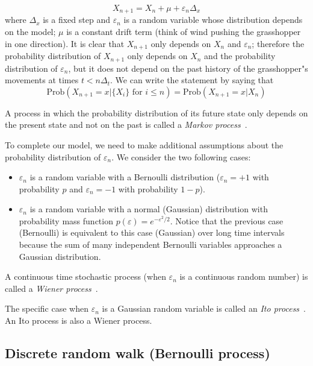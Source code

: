 \documentclass[justified, sixbynine]{tufte-book}
\theoremstyle{plain}%
\newtheorem * {corollary}{Corollary}
\theoremstyle{definition}
\theoremstyle{remark}
\newtheorem * {remark}{Remark}
\newtheorem * {note}{Note}
\begin{document}
\begin{fullwidth}
\begin{equation}
X_{n+1}=X_n + \mu + \varepsilon _n\Delta _x  \label{markov1}
\end{equation}
where $\Delta _x$ is a fixed step and $\varepsilon _n$ is a random variable
whose distribution depends on the model; $\mu$ is a constant drift term
(think of wind pushing the grasshopper in one direction).
It is clear that $X_{n+1}$ only
depends on $X_n$ and $\varepsilon _n$; therefore the probability distribution
of $X_{n+1}$ only depends on $X_n$ and the probability distribution of $%
\varepsilon _n$, but it does not depend on the past history of the grasshopper"s movements at
times $t<n\Delta _t$. We can write the statement by saying that
\begin{equation}
\textrm{Prob}(X_{n+1}=x|\{X_i\}\text{ for }i\leq n)=\textrm{Prob}(X_{n+1}=x|X_n)  \label{markov2}
\end{equation}

A process in which the probability distribution of its future state only
depends on the present state and not on the past is called a
{\it Markov process}~\cite{markov}.

To complete our model, we need to make additional assumptions about the
probability distribution of $\varepsilon _n$. We consider the two following cases:

\begin{itemize}
\item  $\varepsilon _n$ is a random variable with a Bernoulli distribution ($%
\varepsilon _n=+1$ with probability $p$ and $\varepsilon _n=-1$ with
probability $1-p$).

\item  $\varepsilon _n$ is a random variable with a normal (Gaussian)
distribution with probability mass function $p(\varepsilon
)=e^{-\varepsilon ^2/2}$. Notice that the previous case (Bernoulli) is equivalent to this case (Gaussian) over long time intervals because the sum of many independent Bernoulli variables approaches a Gaussian distribution.
\end{itemize}

A continuous time stochastic process (when
$\varepsilon _n$ is a continuous random number)
is called a {\it Wiener process}~\cite{wiener}.

The specific case when $\varepsilon _n$ is a Gaussian random variable is called an {\it Ito process}~\cite{ito}. An Ito process is also a Wiener process.

\goodbreak\subsection{Discrete random walk (Bernoulli process)}


\end{fullwidth}
\end{document}
